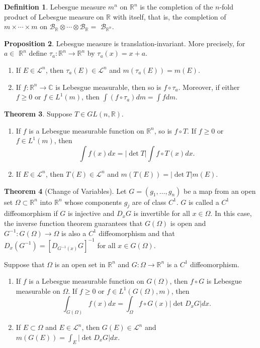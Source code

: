 \documentclass[12pt,a4paper]{book}
\newenvironment{enu}{\begin{enumerate}[(1)]}{\end{enumerate}}
\theoremstyle{definition}
\newtheorem{defn}{Definition}[section]
\newtheorem{theo}[defn]{Theorem}
\newtheorem{prop}[defn]{Proposition}
\begin{document}
\begin{defn}
    Lebesgue measure $m^n$ on $\mathbb{R}^n$ is the completion of the $n$-fold product of Lebesgue measure on $\mathbb{R}$ with itself, that is, the completion of $m \times \cdots \times m$ on $\mathcal{B}_{\mathbb{R}} \otimes \cdots \otimes \mathcal{B}_{\mathbb{R}}=$ $\mathcal{B}_{\mathbb{R}^n}$.
\end{defn}
\begin{prop}
    Lebesgue measure is translation-invariant. More precisely, for $a \in$ $\mathbb{R}^n$ define $\tau_a: \mathbb{R}^n \rightarrow \mathbb{R}^n$ by $\tau_a(x)=x+a$.
    \begin{enu}
        \item If $E \in \mathcal{L}^n$, then $\tau_a(E) \in \mathcal{L}^n$ and $m\left(\tau_a(E)\right)=m(E)$.
        \item If $f: \mathbb{R}^n \rightarrow \mathbb{C}$ is Lebesgue measurable, then so is $f \circ \tau_a$. Moreover, if either $f \geq 0$ or $f \in L^1(m)$, then $\int\left(f \circ \tau_a\right) d m=\int f d m$.
    \end{enu}
\end{prop}
\begin{theo}
    Suppose $T \in G L(n, \mathbb{R})$.
    \begin{enu}
        \item If $f$ is a Lebesgue measurable function on $\mathbb{R}^n$, so is $f \circ T$. If $f \geq 0$ or $f \in L^1(m)$, then
        $$
            \int f(x) d x=|\operatorname{det} T| \int f \circ T(x) d x .
        $$
        \item If $E \in \mathcal{L}^n$, then $T(E) \in \mathcal{L}^n$ and $m(T(E))=|\operatorname{det} T| m(E)$.
    \end{enu}
\end{theo}
\begin{theo}[Change of Variables]
    Let $G=\left(g_1, \ldots, g_n\right)$ be a map from an open set $\Omega \subset \mathbb{R}^n$ into $\mathbb{R}^n$ whose components $g_j$ are of class $C^1$. $G$ is called a $C^1$ diffeomorphism if $G$ is injective and $D_x G$ is invertible for all $x \in \Omega$. In this case, the inverse function theorem guarantees that $G(\Omega)$ is open and $G^{-1}: G(\Omega) \rightarrow \Omega$ is also a $C^1$ diffeomorphism and that $D_x\left(G^{-1}\right)=\left[D_{G^{-1}(x)} G\right]^{-1}$ for all $x \in G(\Omega)$.

    Suppose that $\Omega$ is an open set in $\mathbb{R}^n$ and $G: \Omega \rightarrow \mathbb{R}^n$ is a $C^1$ diffeomorphism.
    \begin{enu}
        \item If $f$ is a Lebesgue measurable function on $G(\Omega)$, then $f \circ G$ is Lebesgue measurable on $\Omega$. If $f \geq 0$ or $f \in L^1(G(\Omega), m)$, then
        $$
            \int_{G(\Omega)} f(x) d x=\int_{\Omega} f \circ G(x)\left|\operatorname{det} D_x G\right| d x .
        $$
        \item If $E \subset \Omega$ and $E \in \mathcal{L}^n$, then $G(E) \in \mathcal{L}^n$ and $m(G(E))=\int_E\left|\operatorname{det} D_x G\right| d x$.
    \end{enu}
\end{theo}
\end{document}
